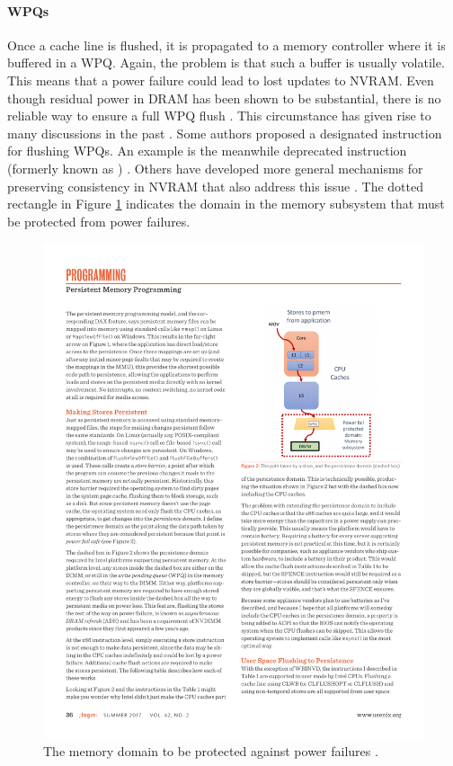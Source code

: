 \paragraph{\acp{WPQ}}

Once a cache line is flushed, it is propagated to a memory controller where it
is buffered in a \ac{WPQ}. Again, the problem is that such a buffer is usually
volatile. This means that a power failure could lead to lost updates to
\ac{NVRAM}. Even though residual power in \ac{DRAM} has been shown to be
substantial, there is no reliable way to ensure a full \ac{WPQ} flush
\cite{halderman2008lest}. This circumstance has given rise to many discussions
in the past \cite{condit2009better, dulloor2014system, kolli2016high}. Some
authors proposed a designated instruction for flushing \acp{WPQ}. An example is
the meanwhile deprecated  instruction (formerly known as
) \cite{dulloor2014system, oukid2015instant,
schwalb2015nvm_malloc, volos2017whisper}. Others have developed more general
mechanisms for preserving consistency in \ac{NVRAM} that also address this issue
\cite{condit2009better, pelley2014memory}. The dotted rectangle in Figure
\ref{fig:wpq} indicates the domain in the memory subsystem that must be
protected from power failures.

\begin{figure}[h!]
    \centering
    \includegraphics{figures/adr-example.pdf}
    \captionsetup{justification=centering}
    \caption{The memory domain to be protected against power failures \cite{rudoff2017persistent}.}
    \label{fig:wpq}
\end{figure}

